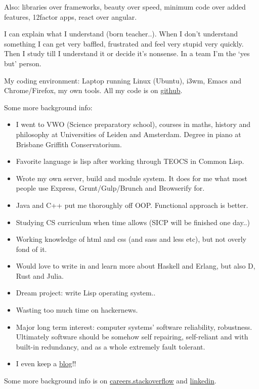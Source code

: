\documentclass[11pt]{article}
\begin{document}
Also: libraries over frameworks, beauty over speed, minimum code over added features, 12factor apps, react over angular.

I can explain what I understand (born teacher..). When I don't understand something I can get very baffled, frustrated and feel very stupid very quickly. Then I study till I understand it or decide it's nonsense. In a team I'm the `yes but' person. 

My coding environment: Laptop running Linux (Ubuntu), i3wm, Emacs and Chrome/Firefox, my own tools. All my code is on \href{http://github.com/michieljoris}{github}.

Some more background info:

\begin{itemize}
\item I went to VWO (Science preparatory school), courses in maths, history and philosophy at Universities of Leiden and Amsterdam. Degree in piano at Brisbane Griffith Conservatorium.
\item Favorite language is lisp after working through TEOCS in Common Lisp.
\item Wrote my own server, build and module system. It does for me what most people use Express, Grunt/Gulp/Brunch and Browserify for.
\item Java and C++ put me thoroughly off OOP. Functional approach is better.
\item Studying CS curriculum when time allows (SICP will be finished one day..)
\item Working knowledge of html and css (and sass and less etc), but not overly fond of it.
\item Would love to write in and learn more about Haskell and Erlang, but also D, Rust and Julia.
\item Dream project: write Lisp operating system..
\item Wasting too much time on hackernews.
\item Major long term interest: computer systems' software reliability, robustness. Ultimately
  software should be somehow self repairing, self-reliant and with built-in
  redundancy, and as a whole extremely fault tolerant.
\item I even keep a \href{http://www.axion5.net}{blog}!!
\end{itemize}
  
Some more background info is on \href{http://careers.stackoverflow.com/michieljoris}{careers.stackoverflow} and \href{http://nl.linkedin.com/in/michieljoris/}{linkedin}.
\end{document}
